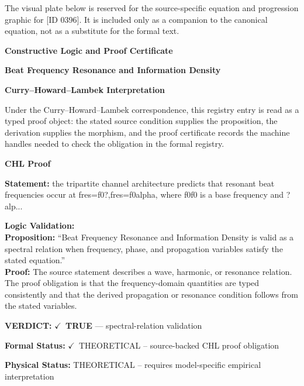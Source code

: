 \begingroup\footnotesize\sloppy
The visual plate below is reserved for the source-specific equation and progression graphic for [ID 0396]. It is included only as a companion to the canonical equation, not as a substitute for the formal text.
\par\endgroup
\ifTZPDarkEdition
{}
\fi

\clearpage
\begingroup\tzpsupportsetup
\noindent\textbf{\fontsize{10.8pt}{12.8pt}\selectfont [ID 0396] Constructive Logic and Proof Certificate}\par
\noindent\textbf{\fontsize{10pt}{12pt}\selectfont Beat Frequency Resonance and Information Density}\par
\vspace{0.45em}
\begingroup
\footnotesize
\setlength{\parskip}{0.22em}
\setlength{\parindent}{0pt}
\noindent\textbf{Curry--Howard--Lambek Interpretation}\par
Under the Curry--Howard--Lambek correspondence, this registry entry is read as a typed proof
object: the stated source condition supplies the proposition, the derivation supplies the
morphism, and the proof certificate records the machine handles needed to check the obligation
in the formal registry.

\vspace{0.45em}
\noindent\textbf{CHL Proof}\par
\textbf{Statement:} the tripartite channel architecture predicts that resonant beat frequencies occur at
fres=f0?,fres=f0alpha, where f0f0 is a base frequency and ?alp...

\textbf{Logic Validation:}\\
\textbf{Proposition:} ``Beat Frequency Resonance and Information Density is valid as a spectral relation when
frequency, phase, and propagation variables satisfy the stated equation.''\\
\textbf{Proof:} The source statement describes a wave, harmonic, or resonance relation. The proof
obligation is that the frequency-domain quantities are typed consistently and that the
derived propagation or resonance condition follows from the stated variables.

\textbf{VERDICT:} \ensuremath{\checkmark}\ \textbf{TRUE} --- spectral-relation validation

\textbf{Formal Status:} \ensuremath{\checkmark}\ THEORETICAL -- source-backed CHL proof obligation

\textbf{Physical Status:} THEORETICAL -- requires model-specific empirical interpretation
\par\vspace{0.45em}
\par
\ifTZPDarkEdition
{}
\fi
\endgroup
\endgroup

